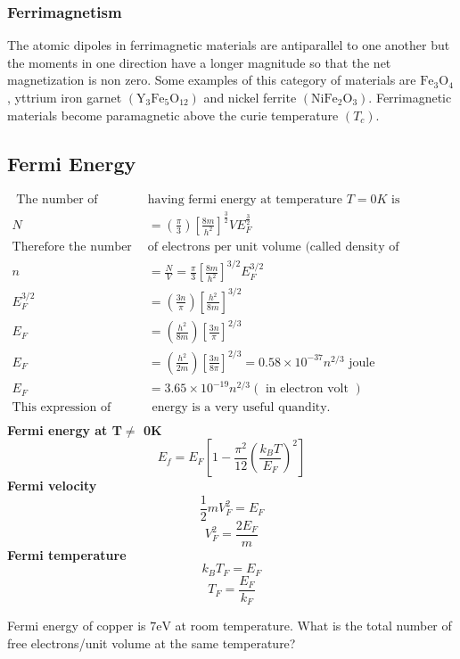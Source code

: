 \subsubsection{Ferrimagnetism}
  The atomic dipoles in ferrimagnetic materials are antiparallel to one another but the moments in one direction have a longer magnitude so that the net magnetization is non zero. Some examples of this category of materials are $\mathrm{Fe}_{3} \mathrm{O}_{4}$, yttrium iron garnet $\left(\mathrm{Y}_{3} \mathrm{Fe}_{5} \mathrm{O}_{12}\right)$ and nickel ferrite $\left(\mathrm{NiFe}_{2} \mathrm{O}_{3}\right) .$ Ferrimagnetic materials become paramagnetic above the curie temperature $\left(T_{c}\right)$.
 
  \subsection{Fermi Energy}
  \begin{align*}
 \text{   The number of electrons }&\text{having fermi energy at temperature $T=0K$ is }\\
  N&=\left( \frac{\pi}{3}\right) \left[ \frac{8m}{h^2}\right]^{\frac{3}{2}}VE_F^{\frac{3}{2}}\\
  \text{Therefore the number }&\text{of electrons per unit volume (called density of electrons) is}\\
  n&=\frac{N}{V}=\frac{\pi}{3}\left[\frac{8 m}{h^{2}}\right]^{3 / 2} E_{F}^{3 / 2}\\
  E_{F}^{3 / 2} &=\left(\frac{3 n}{\pi}\right)\left[\frac{h^{2}}{8 m}\right]^{3 / 2} \\
  E_{F} &=\left(\frac{h^{2}}{8 m}\right)\left[\frac{3 n}{\pi}\right]^{2 / 3} \\
  E_{F} &=\left(\frac{h^{2}}{2 m}\right)\left[\frac{3 n}{8 \pi}\right]^{2 / 3}=0.58 \times 10^{-37} n^{2/3} \text { joule } \\
  E_{F}&=3.65 \times 10^{-19} n^{2 / 3}(\text { in electron volt }) \\
  \text{This expression of Fermi}&\text{ energy is a very useful quandity.}\\
  \end{align*}
  \textbf{Fermi energy at T$\neq$ 0K}
  $$E_f=E_F\left[ 1-\frac{\pi^2}{12}\left( \frac{k_BT}{E_F}\right) ^2\right] $$
  \textbf{Fermi velocity}
  $$\frac{1}{2}mV_F^2=E_F$$
  $$V_F^2=\frac{2E_F}{m}$$
  \textbf{Fermi temperature}
  $$k_BT_F=E_F$$
  $$T_F=\frac{E_F}{k_F}$$
  \begin{exercise}
  Fermi energy of copper is $7 \mathrm{eV}$ at room temperature. What is the total number of free electrons/unit volume at the same temperature? 
  \end{exercise}
